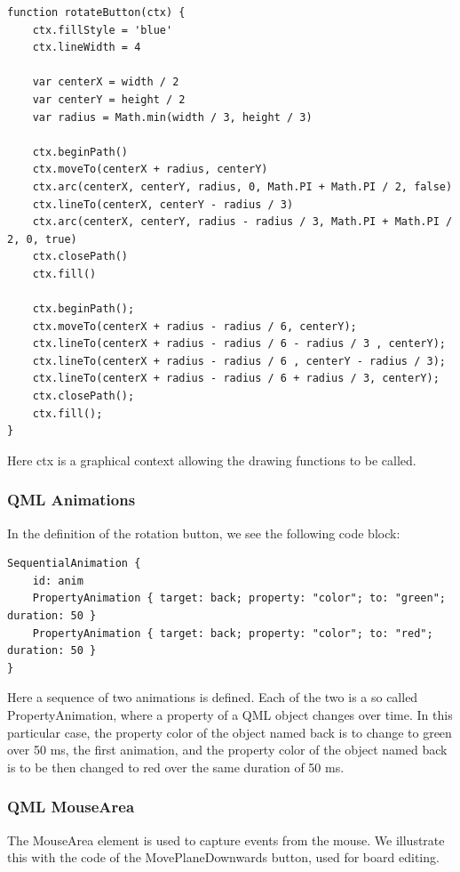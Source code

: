 \begin{lstlisting}
function rotateButton(ctx) {
	ctx.fillStyle = 'blue'
	ctx.lineWidth = 4
	
	var centerX = width / 2
	var centerY = height / 2
	var radius = Math.min(width / 3, height / 3)
	
	ctx.beginPath()
	ctx.moveTo(centerX + radius, centerY)
	ctx.arc(centerX, centerY, radius, 0, Math.PI + Math.PI / 2, false)
	ctx.lineTo(centerX, centerY - radius / 3)
	ctx.arc(centerX, centerY, radius - radius / 3, Math.PI + Math.PI / 2, 0, true)
	ctx.closePath()
	ctx.fill()
	
	ctx.beginPath();
	ctx.moveTo(centerX + radius - radius / 6, centerY);
	ctx.lineTo(centerX + radius - radius / 6 - radius / 3 , centerY);
	ctx.lineTo(centerX + radius - radius / 6 , centerY - radius / 3);
	ctx.lineTo(centerX + radius - radius / 6 + radius / 3, centerY);
	ctx.closePath();
	ctx.fill();
}
\end{lstlisting}

Here ctx is a graphical context allowing the drawing functions to be called.

\subsubsection {QML Animations} \label{qml:animation}

In the definition of the rotation button, we see the following code block:

\begin{lstlisting}
SequentialAnimation {
	id: anim
	PropertyAnimation { target: back; property: "color"; to: "green"; duration: 50 }
	PropertyAnimation { target: back; property: "color"; to: "red"; duration: 50 }
}
\end{lstlisting}

Here a sequence of two animations is defined. Each of the two is a so called PropertyAnimation, where a property of a QML object changes over time. In this particular case, the property color of the object named back is to change to green over 50 ms, the first animation, and the property color of the object named back is to be then changed to red over the same duration of 50 ms.


\subsubsection {QML MouseArea} \label{qml:mouse_area}

The MouseArea element is used to capture events from the mouse. We illustrate this with the code of the MovePlaneDownwards button, used for board editing.

